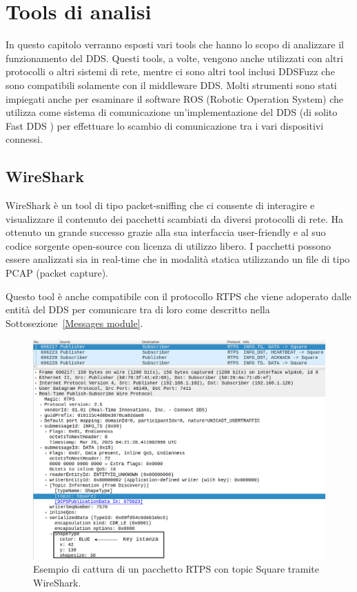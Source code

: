 \chapter{Tools di analisi}
In questo capitolo verranno esposti vari tools che hanno lo 
scopo di analizzare il funzionamento del DDS.
Questi tools,
a volte,
vengono anche utilizzati con altri protocolli o 
altri sistemi di rete, mentre ci sono altri tool inclusi DDSFuzz 
che sono compatibili solamente con il middleware DDS. Molti 
strumenti sono stati impiegati anche per esaminare il 
software ROS (Robotic Operation System) che utilizza come 
sistema di comunicazione un'implementazione del DDS 
(di solito Fast DDS \cite{FastDDS}) per effettuare lo scambio 
di comunicazione tra i vari dispositivi connessi.

\section{WireShark}
WireShark è un tool di tipo packet-sniffing che ci consente di 
interagire e visualizzare il contenuto dei pacchetti scambiati da 
diversi protocolli di rete. Ha ottenuto un grande successo 
grazie alla sua interfaccia user-friendly e al suo codice sorgente 
open-source con licenza di utilizzo libero. I pacchetti possono 
essere analizzati sia in real-time che in modalità statica utilizzando 
un file di tipo PCAP (packet capture). 

Questo tool è anche compatibile con il protocollo RTPS che viene
adoperato dalle entità del DDS per comunicare tra di loro 
come descritto nella Sottosezione~\ref{Messages module}.
\begin{figure}[H]
    \centering
    \includegraphics[width=15.2cm, keepaspectratio]{img/Info_ts e info_DST-Pagina-4.jpg}
    \caption{Esempio di cattura di un pacchetto RTPS con topic 
    Square tramite WireShark.}
    \label{wireskartshapesdemo}
\end{figure}

